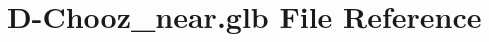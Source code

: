 \hypertarget{D-Chooz__near_8glb}{}\section{D-\/\+Chooz\+\_\+near.glb File Reference}
\label{D-Chooz__near_8glb}
